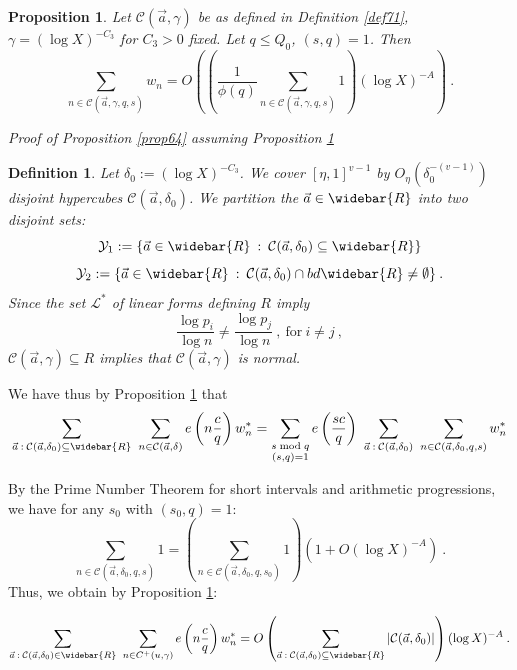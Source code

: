 \documentclass{amsart}
\newtheorem{proposition}[theorem]{Proposition}
\numberwithin{equation}{subsection}
\newtheorem{definition}[theorem]{Definition}
\begin{document}
\begin{proposition}\label{prop72}
Let $\mathcal{C}(\vec{a}, \gamma)$ be as defined in Definition \ref{def71}, $\gamma=(\log X)^{-C_3}$ for $C_3>0$ fixed. Let $q\leq Q_0$, $(s, q)=1$. Then
$$\sum_{n\in \mathcal{C}(\vec{a}, \gamma, q, s)} w_n=O\left(\left(\frac{1}{\phi(q)} \sum_{n\in\mathcal{C}(\vec{a}, \gamma, q, s)} 1\right) (\log X)^{-A}\right)\:.$$
\end{proposition}

\textit{Proof of Proposition \ref{prop64} assuming Proposition \ref{prop73}}

\begin{definition}\label{prop73}
Let $\delta_0:=(\log X)^{-C_3}$. We cover  $[\eta, 1]^{v-1}$ by $O_\eta(\delta_0^{-(v-1)})$ disjoint hypercubes $\mathcal{C}(\vec{a}, \delta_0)$. We partition the $\vec{a}\in\widebar{R}$ into two disjoint sets:
$$\mathcal{Y}_1:=\{ \vec{a}\in\widebar{R}\::\: \mathcal{C}(\vec{a}, \delta_0)\subseteq \widebar{R}\}$$
$$\mathcal{Y}_2:=\{ \vec{a}\in\widebar{R}\::\: \mathcal{C}(\vec{a}, \delta_0)\cap bd \widebar{R}\neq \emptyset \}\:.$$
Since the set $\mathcal{L}^*$ of linear forms defining $R$ imply
$$\frac{\log p_i}{\log n}\neq \frac{\log p_j}{\log n}\:,\ \text{for}\ i\neq j\:,$$
$\mathcal{C}(\vec{a}, \gamma)\subseteq R$ implies that $\mathcal{C}(\vec{a}, \gamma)$ is normal. 
\end{definition}

\noindent We have thus by Proposition \ref{prop72} that
$$\sum_{\vec{a}\::\: \mathcal{C}(\vec{a}, \delta_0)\subseteq \widebar{R}}\  \sum_{n\in \mathcal{C}(\vec{a}, \delta)} e\left(n \frac{c}{q}\right) w_n^*=\sum_{\substack{s \bmod q \\ (s, q)=1}} e\left(\frac{sc}{q}\right)\ \sum_{\vec{a}\::\:\mathcal{C}(\vec{a}, \delta_0)}\ \sum_{n\in \mathcal{C}(\vec{a}, \delta_0, q, s)} w_n^*$$

\noindent By the Prime Number Theorem for short intervals and arithmetic progressions, we have for any $s_0$ with $(s_0, q)=1$:
$$\sum_{n\in \mathcal{C}(\vec{a}, \delta_0, q, s)}1 =\left(\sum_{n\in \mathcal{C}(\vec{a}, \delta_0, q, s_0)}1 \right)\left( 1+O(\log X)^{-A}\right)\:.$$
Thus, we obtain by Proposition \ref{prop72}:

$$\sum_{\vec{a}\::\: \mathcal{C}(\vec{a}, \delta_0)\in \widebar{R}}\ \sum_{n\in C^+(u, \gamma)} e\left(n\frac{c}{q}\right) w_n^*=O\left(\sum_{\vec{a}\::\: \mathcal{C}(\vec{a}, \delta_0)\subseteq \widebar{R}} |\mathcal{C}(\vec{a}, \delta_0)|\right) (\log X)^{-A}\:.$$ 
\end{document}

